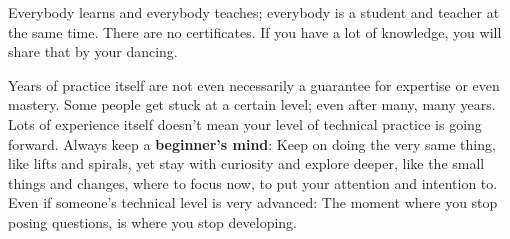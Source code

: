 Everybody learns and everybody teaches; everybody is a student and teacher at the same time.
There are no certificates.
If you have a lot of knowledge, you will share that by your dancing.

Years of practice itself are not even necessarily a guarantee for expertise or even mastery.
Some people get stuck at a certain level; even after many, many years.
Lots of experience itself doesn't mean your level of technical practice is going forward.
Always keep a \textbf{beginner's mind}: Keep on doing the very same thing, like lifts and spirals, yet stay with curiosity and explore deeper, like the small things and changes, where to focus now, to put your attention and intention to.
Even if someone's technical level is very advanced: The moment where you stop posing questions, is where you stop developing.
